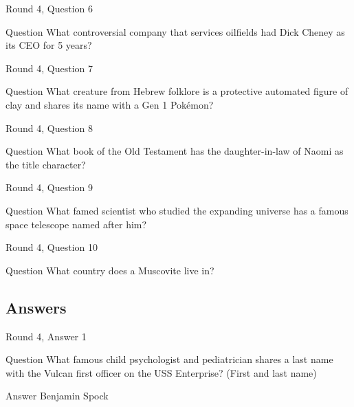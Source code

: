 \documentclass[11pt]{beamer}
\begin{document}
\begin{frame}{Round 4, Question 6}
\begin{block}{Question}
What controversial company that services oilfields had Dick Cheney as its CEO for 5 years\@?
\end{block}
\end{frame}
    

\begin{frame}{Round 4, Question 7}
\begin{block}{Question}
What creature from Hebrew folklore is a protective automated figure of clay and shares its name with a Gen 1 Pokémon\@?
\end{block}
\end{frame}
    

\begin{frame}{Round 4, Question 8}
\begin{block}{Question}
What book of the Old Testament has the daughter-in-law of Naomi as the title character\@?
\end{block}
\end{frame}
    

\begin{frame}{Round 4, Question 9}
\begin{block}{Question}
What famed scientist who studied the expanding universe has a famous space telescope named after him\@?
\end{block}
\end{frame}
    

\begin{frame}{Round 4, Question 10}
\begin{block}{Question}
What country does a Muscovite live in\@?
\end{block}
\end{frame}
    
\subsection{Answers}

\begin{frame}{Round 4, Answer 1}
\begin{block}{Question}
What famous child psychologist and pediatrician shares a last name with the Vulcan first officer on the USS Enterprise? (First and last name)
\end{block}
\pause{}
\begin{block}{Answer}
Benjamin Spock
\end{block}
\end{frame}
    
\end{document}
